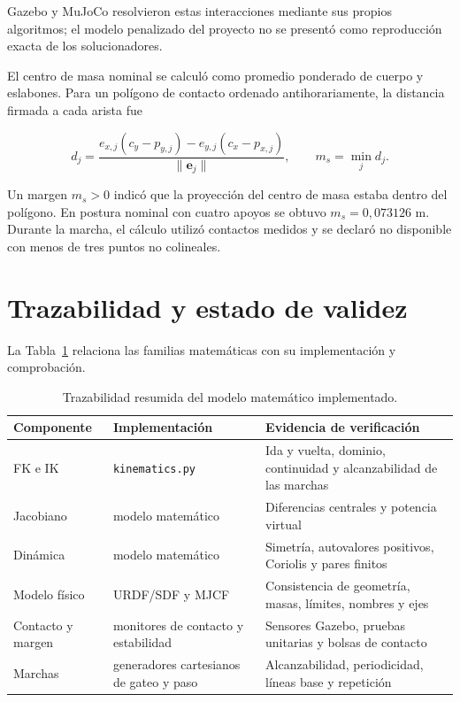 Gazebo y MuJoCo resolvieron estas interacciones mediante sus propios algoritmos;
el modelo penalizado del proyecto no se presentó como reproducción exacta de
los solucionadores.

El centro de masa nominal se calculó como promedio ponderado de cuerpo y
eslabones. Para un polígono de contacto ordenado antihorariamente, la distancia
firmada a cada arista fue

\begin{equation}
d_j=\frac{e_{x,j}(c_y-p_{y,j})-e_{y,j}(c_x-p_{x,j})}
{\|\mathbf e_j\|},
\qquad m_s=\min_jd_j.
\label{eq:nova-static-margin}
\end{equation}

Un margen $m_s>0$ indicó que la proyección del centro de masa estaba dentro del
polígono. En postura nominal con cuatro apoyos se obtuvo
$m_s=0,073126$ m. Durante la marcha, el cálculo utilizó contactos medidos y se
declaró no disponible con menos de tres puntos no colineales.

\section{Trazabilidad y estado de validez}

La Tabla~\ref{tab:model-traceability} relaciona las familias matemáticas con su
implementación y comprobación.

\begin{table}[H]
\centering
\caption{Trazabilidad resumida del modelo matemático implementado.}
\label{tab:model-traceability}
\footnotesize
\begin{tabular}{>{\raggedright\arraybackslash}p{2.3cm}
>{\raggedright\arraybackslash}p{3.8cm}
>{\raggedright\arraybackslash}p{5.2cm}}
\toprule
Componente & Implementación & Evidencia de verificación \\
\midrule
FK e IK & \texttt{kinematics.py} & Ida y vuelta, dominio, continuidad y
alcanzabilidad de las marchas \\
Jacobiano & modelo matemático & Diferencias centrales y potencia
virtual \\
Dinámica & modelo matemático & Simetría, autovalores positivos,
Coriolis y pares finitos \\
Modelo físico & URDF/SDF y MJCF & Consistencia de geometría, masas, límites,
nombres y ejes \\
Contacto y margen & monitores de contacto y estabilidad & Sensores Gazebo,
pruebas unitarias y bolsas
de contacto \\
Marchas & generadores cartesianos de gateo y paso &
Alcanzabilidad, periodicidad, líneas base y repetición \\
\bottomrule
\end{tabular}
\end{table}

